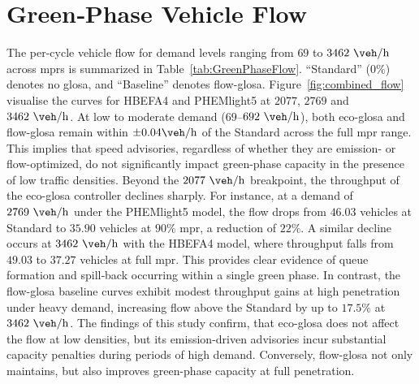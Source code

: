 \section{Green‐Phase Vehicle Flow}
\label{sec:Results_GreenPhaseFlow}

The per-cycle vehicle flow for demand levels ranging from $69$ to $3462~\unit{\veh\per\hour}$ across \acp{mpr} is summarized in Table~\vref{tab:GreenPhaseFlow}. \enquote{Standard} ($0\%$) denotes no \ac{glosa}, and \enquote{Baseline} denotes \ac{flow-glosa}. Figure~\vref{fig:combined_flow} visualise the curves for HBEFA4 and PHEMlight5 at $2077$, $2769$ and $3462~\unit{\veh\per\hour}$. At low to moderate demand ($69$--$692~\unit{\veh\per\hour}$), both \ac{eco-glosa} and \ac{flow-glosa} remain within $\pm0.04\unit{\veh\per\hour}$ of the Standard across the full \ac{mpr} range. This implies that speed advisories, regardless of whether they are emission- or flow-optimized, do not significantly impact green-phase capacity in the presence of low traffic densities. Beyond the $2077~\unit{\veh\per\hour}$ breakpoint, the throughput of the \ac{eco-glosa} controller declines sharply. For instance, at a demand of $2769~\unit{\veh\per\hour}$ under the PHEMlight5 model, the flow drops from $46.03$ vehicles at Standard to $35.90$ vehicles at $90\%$ \ac{mpr}, a reduction of $22\%$. A similar decline occurs at $3462~\unit{\veh\per\hour}$ with the HBEFA4 model, where throughput falls from $49.03$ to $37.27$ vehicles at full \ac{mpr}. This provides clear evidence of queue formation and spill‐back occurring within a single green phase. In contrast, the \ac{flow-glosa} baseline curves exhibit modest throughput gains at high penetration under heavy demand, increasing flow above the Standard by up to $17.5\%$ at $3462~\unit{\veh\per\hour}$. The findings of this study confirm, that \ac{eco-glosa} does not affect the flow at low densities, but its emission-driven advisories incur substantial capacity penalties during periods of high demand. Conversely, \ac{flow-glosa} not only maintains, but also improves green-phase capacity at full penetration.

